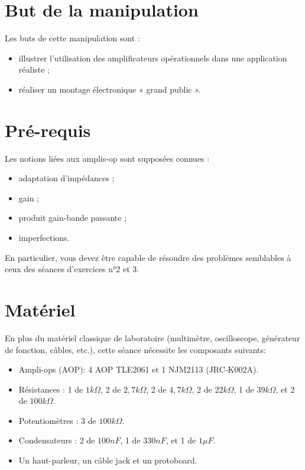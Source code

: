\documentclass{../template/labo}
\author{The Fantastic Four}
\begin{document}

\section{But de la manipulation}

Les buts de cette manipulation sont :
\begin{itemize}
	\item illustrer l'utilisation des amplificateurs opérationnels dans une application réaliste ;
	\item réaliser un montage électronique « grand public ».
\end{itemize}

\section{Pré-requis}
Les notions liées aux amplis-op sont supposées connues :
\begin{itemize}
\item adaptation d'impédances ;
\item gain ;
\item produit gain-bande passante ;
\item imperfections.
\end{itemize}
En particulier, vous devez être capable de résoudre des problèmes semblables à ceux des séances d'exercices n°2 et 3.

\section{Matériel}
En plus du matériel classique de laboratoire (multimètre, oscilloscope, générateur de fonction, câbles, etc.), cette séance nécessite les composants suivants:
\begin{itemize}
\item Ampli-ops (AOP): 4 AOP TLE2061 et 1 NJM2113 (JRC-K002A).
\item Résistances : 1 de $1k\Omega$, 2 de $2,7k\Omega$, 2 de $4,7k\Omega$, 2 de $22k\Omega$, 1 de $39k\Omega$, et 2 de $100k\Omega$.
\item Potentiomètres : 3 de $100k\Omega$.
\item Condensateurs : 2 de $100nF$, 1 de $330nF$, et 1 de $1\mu F$.
\item Un haut-parleur, un câble jack et un protoboard.
\end{itemize}

\newpage
\end{document}
